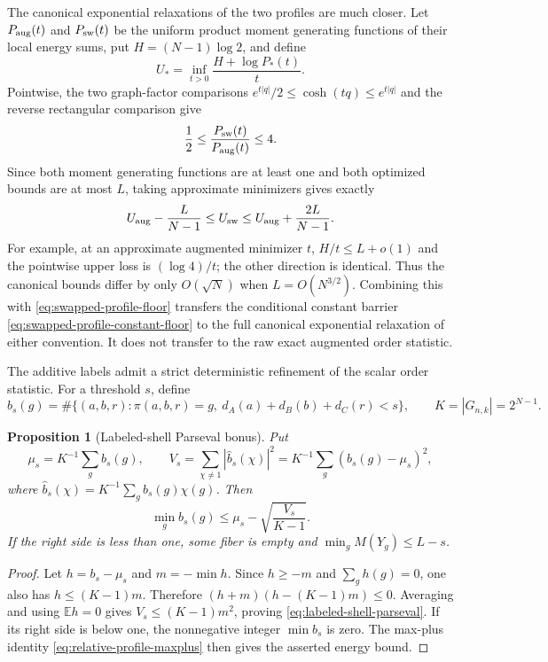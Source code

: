 \documentclass[11pt]{article}
\newtheorem{proposition}[theorem]{Proposition}
\newcommand{\E}{\mathbb E}
\begin{document}
The canonical exponential relaxations of the two profiles are much closer.
Let $P_{\rm aug}(t)$ and $P_{\rm sw}(t)$ be the uniform product moment
generating functions of their local energy sums, put $H=(N-1)\log2$, and
define
\[
 U_*=\inf_{t>0}\frac{H+\log P_*(t)}t.
\]
Pointwise, the two graph-factor comparisons
$e^{t|q|}/2\le\cosh(tq)\le e^{t|q|}$ and the reverse rectangular comparison
give
\[
 \frac12\le\frac{P_{\rm sw}(t)}{P_{\rm aug}(t)}\le4.
\]
Since both moment generating functions are at least one and both optimized
bounds are at most $L$, taking approximate minimizers gives exactly
\begin{equation}
 U_{\rm aug}-\frac{L}{N-1}
 \le U_{\rm sw}
 \le U_{\rm aug}+\frac{2L}{N-1}.
 \label{eq:swapped-profile-canonical-comparison}
\end{equation}
For example, at an approximate augmented minimizer $t$,
$H/t\le L+o(1)$ and the pointwise upper loss is $(\log4)/t$; the other
direction is identical.  Thus the canonical bounds differ by only
$O(\sqrt N)$ when $L=O(N^{3/2})$.  Combining this with
\eqref{eq:swapped-profile-floor} transfers the conditional constant barrier
\eqref{eq:swapped-profile-constant-floor} to the full canonical exponential
relaxation of either convention.  It does not transfer to the raw exact
augmented order statistic.

The additive labels admit a strict deterministic refinement of the scalar
order statistic.  For a threshold $s$, define
\[
 b_s(g)=\#\{(a,b,r):\pi(a,b,r)=g,\
 d_A(a)+d_B(b)+d_C(r)<s\},
 \qquad K=|G_{n,k}|=2^{N-1}.
\]

\begin{proposition}[Labeled-shell Parseval bonus]
\label{prop:labeled-shell-parseval}
Put
\[
 \mu_s=K^{-1}\sum_g b_s(g),\qquad
 V_s=\sum_{\chi\ne1}|\widehat b_s(\chi)|^2
 =K^{-1}\sum_g(b_s(g)-\mu_s)^2,
\]
where $\widehat b_s(\chi)=K^{-1}\sum_g b_s(g)\chi(g)$.  Then
\begin{equation}
 \min_gb_s(g)\le\mu_s-\sqrt{\frac{V_s}{K-1}}.
 \label{eq:labeled-shell-parseval}
\end{equation}
If the right side is less than one, some fiber is empty and
$\min_gM(Y_g)\le L-s$.
\end{proposition}

\begin{proof}
Let $h=b_s-\mu_s$ and $m=-\min h$.  Since $h\ge-m$ and $\sum_gh(g)=0$,
one also has $h\le(K-1)m$.  Therefore
$(h+m)(h-(K-1)m)\le0$.  Averaging and using $\E h=0$ gives
$V_s\le(K-1)m^2$, proving \eqref{eq:labeled-shell-parseval}.  If its right
side is below one, the nonnegative integer $\min b_s$ is zero.  The max-plus
identity \eqref{eq:relative-profile-maxplus} then gives the asserted energy
bound.
\end{proof}
\end{document}
